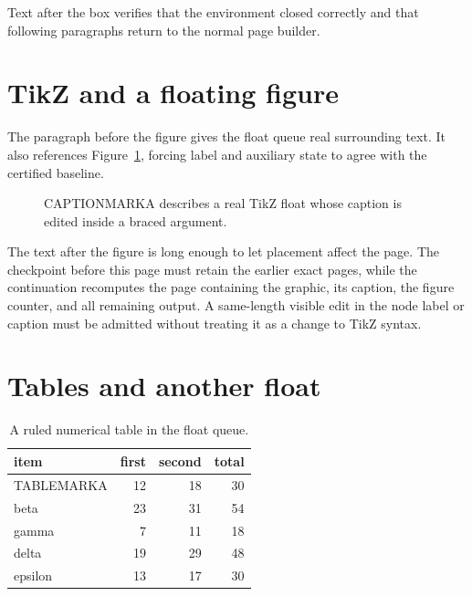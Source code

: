\documentclass[11pt,a4paper]{article}
\begin{document}
Text after the box verifies that the environment closed correctly and that
following paragraphs return to the normal page builder.

\clearpage

\section{TikZ and a floating figure}

The paragraph before the figure gives the float queue real surrounding text.
It also references Figure~\ref{fig:mixed-heavy}, forcing label and auxiliary
state to agree with the certified baseline.

\begin{figure}[htbp]
  \centering
  \caption{CAPTIONMARKA describes a real TikZ float whose caption is edited
  inside a braced argument.}
  \label{fig:mixed-heavy}
\end{figure}

The text after the figure is long enough to let placement affect the page.
The checkpoint before this page must retain the earlier exact pages, while
the continuation recomputes the page containing the graphic, its caption,
the figure counter, and all remaining output. A same-length visible edit in
the node label or caption must be admitted without treating it as a change
to TikZ syntax.

\clearpage

\section{Tables and another float}

\begin{table}[htbp]
  \centering
  \begin{tabular}{lrrr}
    \toprule
    item & first & second & total \\
    \midrule
    TABLEMARKA & 12 & 18 & 30 \\
    beta       & 23 & 31 & 54 \\
    gamma      &  7 & 11 & 18 \\
    delta      & 19 & 29 & 48 \\
    epsilon    & 13 & 17 & 30 \\
    \bottomrule
  \end{tabular}
  \caption{A ruled numerical table in the float queue.}
  \label{tab:mixed-heavy}
\end{table}
\end{document}
